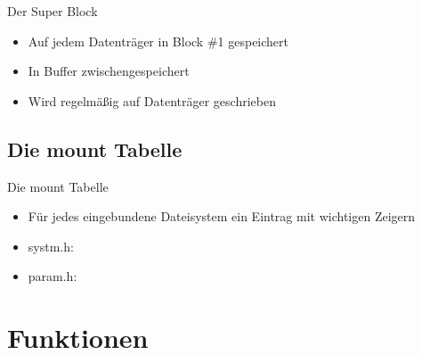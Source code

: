 \documentclass{beamer}
\begin{document}
\begin{frame}{Der Super Block}
    \begin{itemize}
        \item Auf jedem Datenträger in Block \#1 gespeichert
        \item In Buffer zwischengespeichert
        \item Wird regelmäßig auf Datenträger geschrieben
    \end{itemize}

    \medskip

    
\end{frame}




\subsection{Die mount Tabelle}

\begin{frame}{Die mount Tabelle}
    \begin{itemize}
        \item Für jedes eingebundene Dateisystem ein Eintrag mit wichtigen Zeigern

        \bigskip

        \item systm.h:
            \smallskip
            

        \bigskip

        \item param.h:
            \smallskip
            
    \end{itemize}
\end{frame}




\section{Funktionen}

\begin{frame}[plain]
    \sectionpage
\end{frame}


\end{document}
